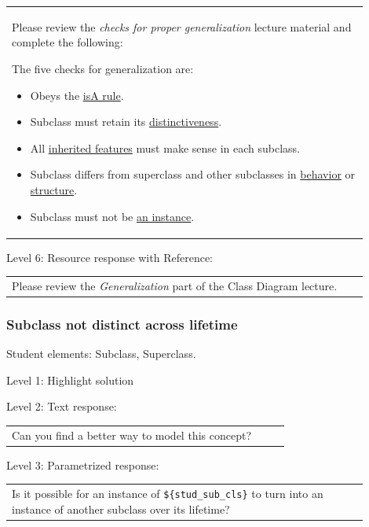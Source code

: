 \begin{tabular}{|p{0.9\linewidth}}

Please review the \textit{checks for proper generalization} lecture material
and complete the following:

The five checks for generalization are:

\begin{itemize}
    \item Obeys the \underline{isA rule}.
    \item Subclass must retain its \underline{distinctiveness}.
    \item All \underline{inherited features} must make sense in each subclass.
    \item Subclass differs from superclass and other subclasses in \underline{behavior} or \underline{structure}.
    \item Subclass must not be \underline{an instance}.
\end{itemize}

\end{tabular} \medskip

\noindent Level 6: Resource response with Reference: \medskip

\begin{tabular}{|p{0.9\linewidth}}
Please review the \textit{Generalization} part of the Class Diagram lecture.
\end{tabular} \medskip


\subsubsection{Subclass not distinct across lifetime}

Student elements: Subclass, Superclass.  \medskip

\noindent Level 1: Highlight solution  \medskip

\noindent Level 2: Text response: \medskip

\begin{tabular}{|p{0.9\linewidth}}
Can you find a better way to model this concept?
\end{tabular} \medskip

\noindent Level 3: Parametrized response: \medskip

\begin{tabular}{|p{0.9\linewidth}}
Is it possible for an instance of \verb|${stud_sub_cls}| to turn into an instance of another subclass over its lifetime?
\end{tabular} \medskip

